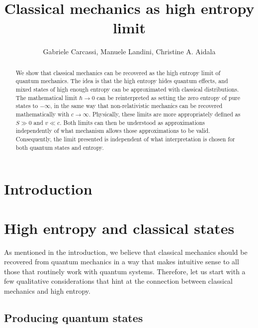 \documentclass{article}
\title{Classical mechanics as high entropy limit}
\author{Gabriele Carcassi, Manuele Landini, Christine A. Aidala}
\begin{document}
\maketitle

\begin{abstract}
We show that classical mechanics can be recovered as the high entropy limit of quantum mechanics. The idea is that the high entropy hides quantum effects, and mixed states of high enough entropy can be approximated with classical distributions. The mathematical limit $\hbar \to 0$ can be reinterpreted as setting the zero entropy of pure states to $-\infty$, in the same way that non-relativistic mechanics can be recovered mathematically with $c \to \infty$. Physically, these limits are more appropriately defined as $S \gg 0$ and $v \ll c$. Both limits can then be understood as approximations independently of what mechanism allows those approximations to be valid. Consequently, the limit presented is independent of what interpretation is chosen for both quantum states and entropy. 
\end{abstract}

\section{Introduction}




\section{High entropy and classical states}

As mentioned in the introduction, we believe that classical mechanics should be recovered from quantum mechanics in a way that makes intuitive sense to all those that routinely work with quantum systems. Therefore, let us start with a few qualitative considerations that hint at the connection between classical mechanics and high entropy.

\subsection{Producing quantum states}
\end{document}
